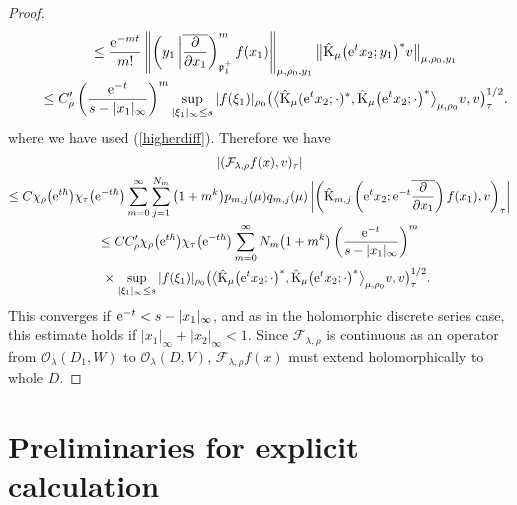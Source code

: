 \documentclass[pdftex]{sigma}
\numberwithin{equation}{section}
\newcommand{\fp}{\mathfrak{p}}
\newcommand{\cF}{\mathcal{F}}
\newcommand{\cO}{\mathcal{O}}
\newcommand{\rK}{\mathrm{K}}
\begin{document}
\begin{proof}
\begin{gather*}
\qquad{}\le \frac{{\rm e}^{-mt}}{m!}
\left\Vert\left(y_1\,\middle|\overline{\frac{\partial}{\partial x_1}}\right)_{\fp^+_1}^mf(x_1)\right\Vert_{\mu,\rho_0,y_1}
\big\Vert \hat{\rK}_\mu\big({\rm e}^tx_2;y_1\big)^*v\big\Vert_{\mu,\rho_0,y_1} \\
\qquad{}\le C_\rho'\left(\frac{{\rm e}^{-t}}{s-|x_1|_\infty}\right)^m\sup_{|\xi_1|_\infty\le s}|f(\xi_1)|_{\rho_0}
\big(\big\langle\hat{\rK}_\mu({\rm e}^tx_2;\cdot)^*,\hat{\rK}_\mu\big({\rm e}^tx_2;\cdot\big)^*\big\rangle_{\mu,\rho_0}v,v\big)_\tau^{1/2}.
\end{gather*}
where we have used (\ref{higherdiff}). Therefore we have
\begin{gather*}
 |(\cF_{\lambda,\rho}f(x),v)_\tau|\\
 \le C\chi_\rho\big({\rm e}^{t\hbar}\big)\chi_\tau\big({\rm e}^{-t\hbar}\big)
\sum_{m=0}^\infty \sum_{j=1}^{N_m}\big(1+m^k\big)p_{m,j}(\mu)q_{m,j}(\mu)
\left|\left(\hat{\rK}_{m,j}\left({\rm e}^tx_2;{\rm e}^{-t}\overline{\frac{\partial}{\partial x_1}}\right)f(x_1),v\right)_\tau\right| \\
 \le CC_\rho'\chi_\rho\big({\rm e}^{t\hbar}\big)\chi_\tau\big({\rm e}^{-t\hbar}\big)
\sum_{m=0}^\infty N_m\big(1+m^k\big)\left(\frac{{\rm e}^{-t}}{s-|x_1|_\infty}\right)^m \\
\quad{}\times\sup_{|\xi_1|_\infty\le s}|f(\xi_1)|_{\rho_0}\big(\big\langle\hat{\rK}_\mu\big({\rm e}^tx_2;\cdot\big)^*,
\hat{\rK}_\mu\big({\rm e}^tx_2;\cdot\big)^*\big\rangle_{\mu,\rho_0}v,v\big)_\tau^{1/2}.
\end{gather*}
This converges if ${\rm e}^{-t}<s-|x_1|_\infty$, and as in the holomorphic discrete series case, this estimate holds if $|x_1|_\infty+|x_2|_\infty<1$.
Since $\cF_{\lambda,\rho}$ is continuous as an operator from $\cO_\lambda(D_1,W)$ to $\cO_\lambda(D,V)$,
$\cF_{\lambda,\rho}f(x)$ must extend holomorphically to whole $D$.
\end{proof}

\section{Preliminaries for explicit calculation}\label{section4}
\end{document}
